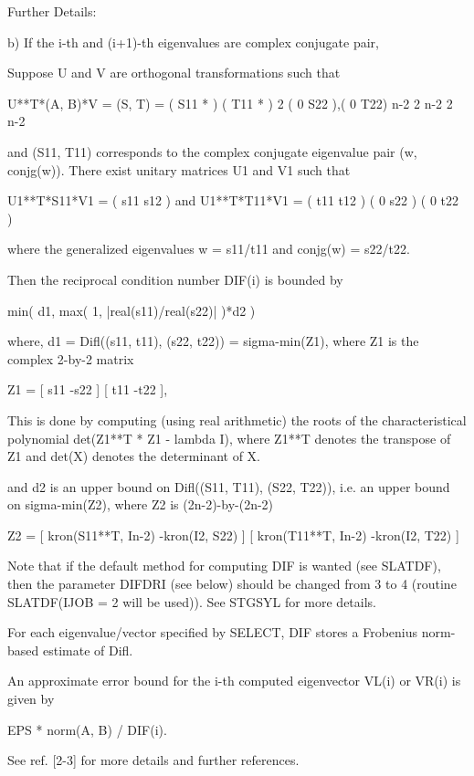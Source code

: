 \begin{DoxyParagraph}{Further Details\+: }
\begin{DoxyVerb}
  b) If the i-th and (i+1)-th eigenvalues are complex conjugate pair,

     Suppose U and V are orthogonal transformations such that

              U**T*(A, B)*V = (S, T) = ( S11  *   ) ( T11  *  )  2
                                       ( 0    S22 ),( 0    T22) n-2
                                         2    n-2     2    n-2

     and (S11, T11) corresponds to the complex conjugate eigenvalue
     pair (w, conjg(w)). There exist unitary matrices U1 and V1 such
     that

       U1**T*S11*V1 = ( s11 s12 ) and U1**T*T11*V1 = ( t11 t12 )
                      (  0  s22 )                    (  0  t22 )

     where the generalized eigenvalues w = s11/t11 and
     conjg(w) = s22/t22.

     Then the reciprocal condition number DIF(i) is bounded by

         min( d1, max( 1, |real(s11)/real(s22)| )*d2 )

     where, d1 = Difl((s11, t11), (s22, t22)) = sigma-min(Z1), where
     Z1 is the complex 2-by-2 matrix

              Z1 =  [ s11  -s22 ]
                    [ t11  -t22 ],

     This is done by computing (using real arithmetic) the
     roots of the characteristical polynomial det(Z1**T * Z1 - lambda I),
     where Z1**T denotes the transpose of Z1 and det(X) denotes
     the determinant of X.

     and d2 is an upper bound on Difl((S11, T11), (S22, T22)), i.e. an
     upper bound on sigma-min(Z2), where Z2 is (2n-2)-by-(2n-2)

              Z2 = [ kron(S11**T, In-2)  -kron(I2, S22) ]
                   [ kron(T11**T, In-2)  -kron(I2, T22) ]

     Note that if the default method for computing DIF is wanted (see
     SLATDF), then the parameter DIFDRI (see below) should be changed
     from 3 to 4 (routine SLATDF(IJOB = 2 will be used)). See STGSYL
     for more details.

  For each eigenvalue/vector specified by SELECT, DIF stores a
  Frobenius norm-based estimate of Difl.

  An approximate error bound for the i-th computed eigenvector VL(i) or
  VR(i) is given by

             EPS * norm(A, B) / DIF(i).

  See ref. [2-3] for more details and further references.\end{DoxyVerb}
 
\end{DoxyParagraph}

